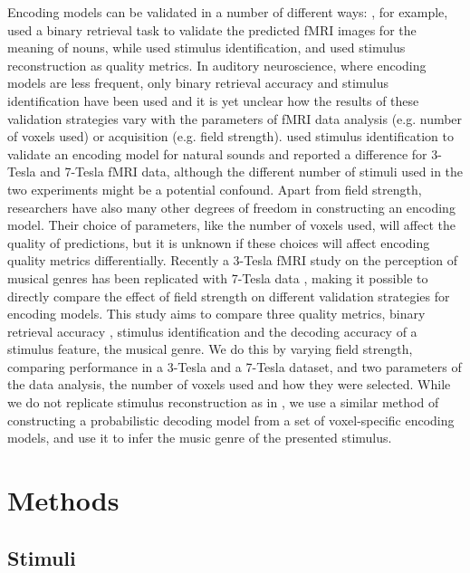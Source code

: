 Encoding models can be validated in a number of different ways: \citet{ML08},
for example, used a binary retrieval task to validate the predicted f{MRI}
images for the meaning of nouns, while \citet{KG+08} used stimulus
identification, and \citet{NG09} used stimulus reconstruction
as quality metrics.  In auditory neuroscience, where encoding models are less
frequent, only binary retrieval accuracy \citep{CTK+2012} and stimulus
identification \citep{SF14} have been used and it is yet unclear how the
results of these validation strategies vary with the parameters of f{MRI} data
analysis (e.g. number of voxels used)  or acquisition (e.g. field strength).
\citet{SF14} used stimulus identification to validate an encoding model for
natural sounds and reported a difference for 3-Tesla and 7-Tesla f{MRI} data,
although the different number of stimuli used in the two experiments might be a
potential confound.  Apart from field strength, researchers have also many
other degrees of freedom in constructing an encoding model.  Their choice of
parameters, like the number of voxels used, will affect the quality of
predictions, but it is unknown if these choices will affect encoding quality
metrics differentially.  Recently a 3-Tesla f{MRI} study on the perception of
musical genres \citep{CTK+2012} has been replicated with 7-Tesla data
\citep{HDH+2015}, making it possible to directly compare the effect of field
strength on different validation strategies for encoding models.  This study
aims to compare three quality metrics, binary retrieval accuracy \citep{ML08},
stimulus identification \citep{KG+08,SF14} and the decoding accuracy of a stimulus
feature, the musical genre. We do this by varying field strength, comparing
performance in a 3-Tesla and a 7-Tesla dataset, and two parameters of the data
analysis, the number of voxels used and how they were selected.  While we do
not replicate stimulus reconstruction as in \citep{NG09}, we use a similar
method of constructing a probabilistic decoding model from a set of
voxel-specific encoding models, and use it to infer the music genre of the
presented stimulus.


\section*{Methods}

\subsection*{Stimuli}

